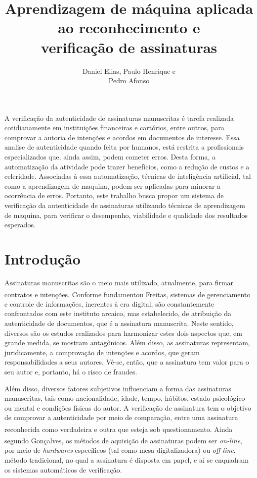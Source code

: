 \documentclass[12pt]{article}
\title{Aprendizagem de máquina aplicada ao reconhecimento e \\verificação de assinaturas}
\author{Daniel Elias\inst{1}, Paulo Henrique\inst{1} e \\Pedro Afonso\inst{1}}
\begin{document}
 
	
	\maketitle
	
	\begin{resumo} 
		A verificação da autenticidade de assinaturas manuscritas é tarefa realizada cotidianamente em instituições financeiras e cartórios, entre outros, para comprovar a autoria de intenções e acordos em documentos de interesse. Essa analise de autenticidade quando feita por humanos, está restrita a profissionais especializados que, ainda assim, podem cometer erros. Desta forma, a automatização da atividade pode trazer benefícios, como a redução de custos e a celeridade. Associadas à essa automatização, técnicas de inteligência artificial, tal como a aprendizagem de maquina, podem ser aplicadas para minorar a ocorrência de erros. Portanto, este trabalho busca propor um sistema de verificação da autenticidade de assinaturas utilizando técnicas de aprendizagem de maquina, para verificar o desempenho, viabilidade e qualidade dos resultados esperados.
	\end{resumo}
	
	\section{Introdução}
		Assinaturas manuscritas são o meio mais utilizado, atualmente, para firmar contratos e intenções. Conforme fundamentou Freitas\textsuperscript{\cite{freitas2003}}, sistemas de gerenciamento e controle de informações, inerentes à era digital, são constantemente confrontados com este instituto arcaico, mas estabelecido, de atribuição da autenticidade de documentos, que é a assinatura manuscrita. Neste sentido, diversos são os estudos realizados para harmonizar estes dois aspectos que, em grande medida, se mostram antagônicos. Além disso, as assinaturas representam, juridicamente, a comprovação de intenções e acordos, que geram responsabilidades a seus autores. Vê-se, então, que a assinatura tem valor para o seu autor e, portanto, há o risco de fraudes.
		
		Além disso, diversos fatores subjetivos influenciam a forma das assinaturas manuscritas, tais como nacionalidade, idade, tempo, hábitos, estado psicológico ou mental e condições físicas do autor. A verificação de assinatura tem o objetivo de comprovar a autenticidade por meio de comparação, entre uma assinatura reconhecida como verdadeira e outra que esteja sob questionamento\textsuperscript{\cite{goncalves2008}}. Ainda segundo Gonçalves\textsuperscript{\cite{goncalves2008}}, os métodos de aquisição de assinaturas podem ser \textit{on-line}, por meio de \textit{hardwares} específicos (tal como mesa digitalizadora) ou \textit{off-line}, método tradicional, no qual a assinatura é disposta em papel, e aí se enquadram os sistemas automáticos de verificação.	
		
\end{document}
